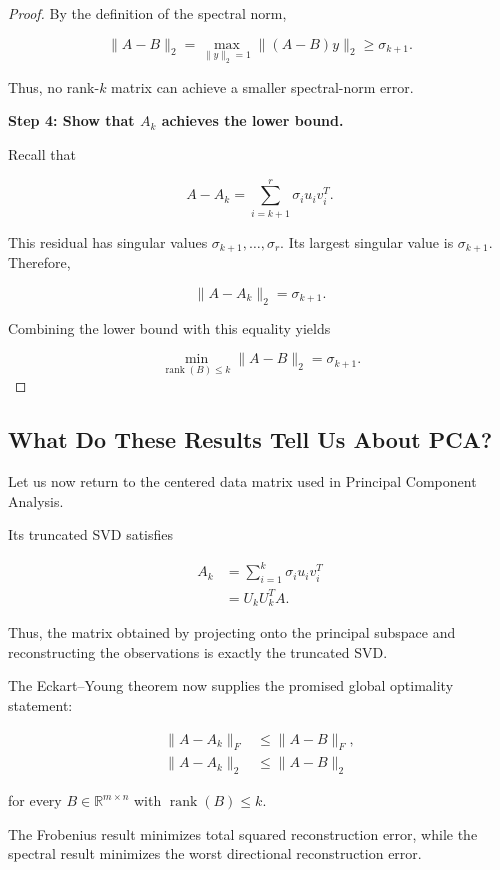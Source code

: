 \documentclass[11pt]{article}
\begin{document}
\begin{proof}
By the definition of the spectral norm,

\[
\boxed{
\|A-B\|_2
=\max_{\|y\|_2=1}\|(A-B)y\|_2
\geq\sigma_{k+1}.
}
\]

Thus, no rank-$k$ matrix can
achieve a smaller spectral-norm error.

\textbf{Step 4: Show that $A_k$
achieves the lower bound.}

Recall that

\[
A-A_k=\sum_{i=k+1}^{r}\sigma_i u_i v_i^T.
\]

This residual has singular values
$\sigma_{k+1},\ldots,\sigma_r$.
Its largest singular value is
$\sigma_{k+1}$. Therefore,

\[
\boxed{\|A-A_k\|_2=\sigma_{k+1}.}
\]

Combining the lower bound with
this equality yields

\[
\boxed{
\min_{\operatorname{rank}(B)\leq k}
\|A-B\|_2=\sigma_{k+1}.
}
\]

\end{proof}

\subsection{What Do These Results Tell Us About PCA?}

Let us now return to the centered data
matrix used in Principal Component Analysis.

Its truncated SVD satisfies

\[
\begin{aligned}
A_k
&=\sum_{i=1}^{k}\sigma_i u_i v_i^T\\
&=U_kU_k^TA.
\end{aligned}
\]

Thus, the matrix obtained by
projecting onto the principal subspace
and reconstructing the observations
is exactly the truncated SVD.

The Eckart--Young theorem now supplies
the promised global optimality statement:

\[
\boxed{
\begin{aligned}
\|A-A_k\|_F
&\leq\|A-B\|_F,\\
\|A-A_k\|_2
&\leq\|A-B\|_2
\end{aligned}
}
\]

for every $B\in\mathbb{R}^{m\times n}$
with $\operatorname{rank}(B)\leq k$.

The Frobenius result minimizes total
squared reconstruction error, while
the spectral result minimizes the
worst directional reconstruction error.
\end{document}
